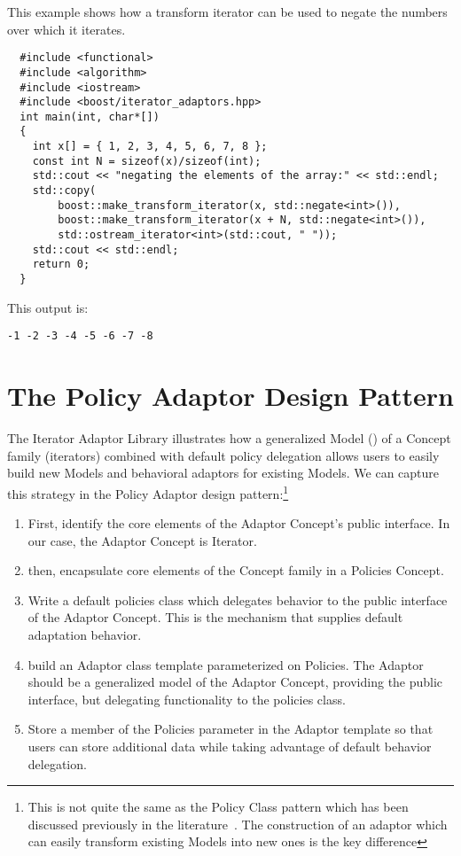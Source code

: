 \documentclass{netobjectdays}
\newcommand{\iteratoradaptor}{\code{iterator\_\-adaptor}}
\begin{document}
This example shows how a transform iterator can be used to
negate the numbers over which it iterates.

{\footnotesize
\begin{verbatim}
  #include <functional>
  #include <algorithm>
  #include <iostream>
  #include <boost/iterator_adaptors.hpp>
  int main(int, char*[])
  {
    int x[] = { 1, 2, 3, 4, 5, 6, 7, 8 };
    const int N = sizeof(x)/sizeof(int);
    std::cout << "negating the elements of the array:" << std::endl;
    std::copy(
        boost::make_transform_iterator(x, std::negate<int>()),
        boost::make_transform_iterator(x + N, std::negate<int>()),
        std::ostream_iterator<int>(std::cout, " "));
    std::cout << std::endl;
    return 0;
  }
\end{verbatim}
}

\noindent This output is: 
{\footnotesize
\begin{verbatim}
-1 -2 -3 -4 -5 -6 -7 -8
\end{verbatim}
}

\section{The Policy Adaptor Design Pattern}

The Iterator Adaptor Library illustrates how a generalized Model
(\iteratoradaptor{}) of a Concept family (iterators) combined with
default policy delegation allows users to easily build new Models and
behavioral adaptors for existing Models. We can capture this strategy
in the Policy Adaptor design pattern:\footnote{This is not quite the
same as the Policy Class pattern which has been discussed previously
in the literature~\cite{alexandrescu01:_modern_cpp_design}. The
construction of an adaptor which can easily transform existing Models
into new ones is the key difference}\begin{enumerate}

 \item First, identify the core elements of the Adaptor Concept's
 public interface. In our case, the Adaptor Concept is Iterator.

 \item then, encapsulate core elements of the Concept family in a
Policies Concept.

 \item Write a default policies class which delegates behavior to the
public interface of the Adaptor Concept. This is the mechanism that
supplies default adaptation behavior.

 \item build an Adaptor class template parameterized on Policies. The
Adaptor should be a generalized model of the Adaptor Concept,
providing the public interface, but delegating functionality to the
policies class.

 \item Store a member of the Policies parameter in the Adaptor
template so that users can store additional data while taking
advantage of default behavior delegation.

\end{enumerate}
\end{document}
